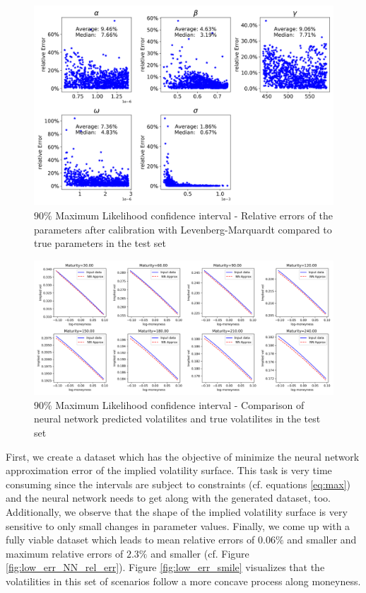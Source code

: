 \documentclass{article}
\begin{document}
\begin{figure}[!ht]
\centering
\includegraphics[width=\textwidth]{MLE_Vola_HNG_ParameterRelativeErrors.png}
\caption{$90\%$ Maximum Likelihood confidence interval - Relative errors of the parameters after calibration with Levenberg-Marquardt compared to true parameters in the test set}
\label{fig:MLE_par_sen}
\end{figure}
\begin{figure}[!ht]
\centering
\includegraphics[width=\textwidth]{MLE_Vola_HNG_smile.png}
\caption{$90\%$ Maximum Likelihood confidence interval - Comparison of neural network predicted volatilites and true volatilites in the test set}
\label{fig:MLE_smile}
\end{figure}
First, we create a dataset which has the objective of minimize the neural network approximation error of the implied volatility surface. This task is very time consuming since the intervals are subject to constraints (cf. equations \ref{eq:max}) and the neural network needs to get along with the generated dataset, too. Additionally, we observe that the shape of the implied volatility surface is very sensitive to only small changes in parameter values. Finally, we come up with a fully viable dataset which leads to mean relative errors of $0.06\%$ and smaller and maximum relative errors of $2.3\%$ and smaller (cf. Figure \ref{fig:low_err_NN_rel_err}). Figure \ref{fig:low_err_smile} visualizes that the volatilities in this set of scenarios follow a more concave process along moneyness.
\end{document}
